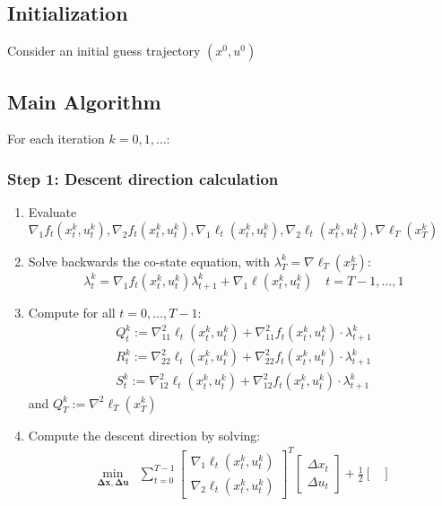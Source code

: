 \documentclass[openany]{book}
\theoremstyle{definition}
\theoremstyle{remark}
\begin{document}
\subsection{Initialization}
Consider an initial guess trajectory $(x^0,u^0)$

\subsection{Main Algorithm}
For each iteration $k=0,1,\dots$:

\subsubsection{Step 1: Descent direction calculation}
\begin{enumerate}
    \item Evaluate $\nabla_1f_t(x_t^k,u_t^k),\nabla_2f_t(x_t^k,u_t^k),\nabla_1\ell_t(x_t^k,u_t^k),\nabla_2\ell_t(x_t^k,u_t^k),\nabla\ell_T(x_T^k)$
    \item Solve backwards the co-state equation, with $\lambda_T^k = \nabla\ell_T(x_T^k)$:
        \[
            \lambda_t^k = \nabla_1f_t(x_t^k,u_t^k)\lambda_{t+1}^k + \nabla_1\ell(x_t^k,u_t^k) \quad t = T-1,\dots,1
        \]
    \item Compute for all $t= 0,\dots,T-1$:
        \begin{gather*}
            Q_t^k := \nabla_{11}^2\ell_t(x_t^k,u_t^k) + \nabla^2_{11}f_t(x_t^k,u_t^k)\cdot \lambda_{t+1}^k \\
            R_t^k := \nabla_{22}^2\ell_t(x_t^k,u_t^k) + \nabla^2_{22}f_t(x_t^k,u_t^k)\cdot \lambda_{t+1}^k\\
            S_t^k := \nabla_{12}^2\ell_t(x_t^k,u_t^k) + \nabla^2_{12}f_t(x_t^k,u_t^k)\cdot \lambda_{t+1}^k
        \end{gather*}
        and $Q_T^k := \nabla^2\ell_T(x_T^k)$
    \item Compute the descent direction by solving:
        \begin{align*}
            \min_{\mathbf{\Delta x, \Delta u}} &\displaystyle\sum_{t=0}^{T-1}\begin{bmatrix}
                \nabla_1\ell_t(x_t^k,u_t^k)\\
                \nabla_2\ell_t(x_t^k,u_t^k)
            \end{bmatrix}^T \begin{bmatrix}
                \Delta x_t \\ \Delta u_t
            \end{bmatrix} + \displaystyle\frac{1}{2}\begin{bmatrix}

\end{bmatrix}
\end{align*}
\end{enumerate}
\end{document}
